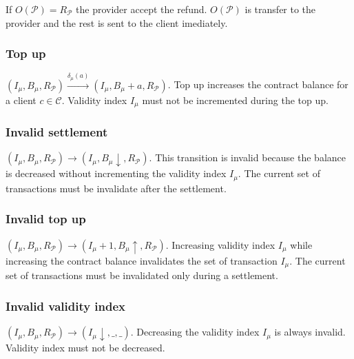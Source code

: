 \documentclass{llncs}
\begin{document}
If $O(\mathcal{P}) = R_\mathcal{P}$ the provider accept the refund. $O(\mathcal{P})$ is transfer to the provider and the rest is sent to the client imediately.

\subsubsection{Top up} $(I_\mu, B_\mu,R_\mathcal{P}) \xrightarrow{\delta_\mu(a)} (I_\mu, B_\mu+a,R_\mathcal{P})$. Top up increases the contract balance for a client $c \in \mathcal{C}$. Validity index $I_\mu$ must not be incremented during the top up.

\subsubsection{Invalid settlement} $(I_\mu, B_\mu,R_\mathcal{P}) \rightarrow (I_\mu, B_\mu\downarrow,R_\mathcal{P})$. This transition is invalid because the balance is decreased without incrementing the validity index $I_\mu$. The current set of transactions must be invalidate after the settlement.

\subsubsection{Invalid top up} $(I_\mu, B_\mu,R_\mathcal{P}) \rightarrow (I_\mu+1, B_\mu\uparrow,R_\mathcal{P})$. Increasing validity index $I_\mu$ while increasing the contract balance invalidates the set of transaction $I_\mu$. The current set of transactions must be invalidated only during a settlement.

\subsubsection{Invalid validity index} $(I_\mu, B_\mu,R_\mathcal{P}) \rightarrow (I_\mu\downarrow, \_, \_)$. Decreasing the validity index $I_\mu$ is always invalid. Validity index must not be decreased.
\end{document}
